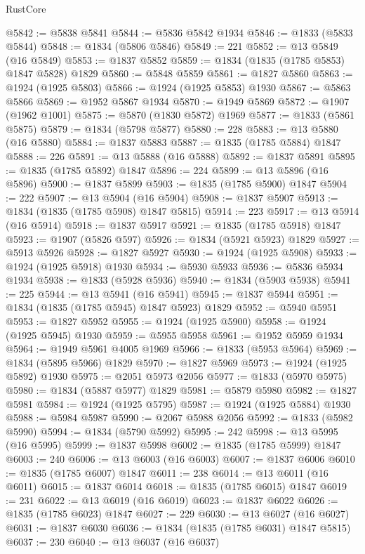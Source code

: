 \begin{lexlean}{RustCore}
\begin{coremodule}
@5842 := @5838 @5841
@5844 := @5836 @5842 @1934
@5846 := @1833 (@5833 @5844)
@5848 := @1834 (@5806 @5846)
@5849 := 221
@5852 := @13 @5849 (@16 @5849)
@5853 := @1837 @5852
@5859 := @1834 (@1835 (@1785 @5853) @1847 @5828) @1829
@5860 := @5848 @5859
@5861 := @1827 @5860
@5863 := @1924 (@1925 @5803)
@5866 := @1924 (@1925 @5853) @1930
@5867 := @5863 @5866
@5869 := @1952 @5867 @1934
@5870 := @1949 @5869
@5872 := @1907 (@1962 @1001)
@5875 := @5870 (@1830 @5872) @1969
@5877 := @1833 (@5861 @5875)
@5879 := @1834 (@5798 @5877)
@5880 := 228
@5883 := @13 @5880 (@16 @5880)
@5884 := @1837 @5883
@5887 := @1835 (@1785 @5884) @1847
@5888 := 226
@5891 := @13 @5888 (@16 @5888)
@5892 := @1837 @5891
@5895 := @1835 (@1785 @5892) @1847
@5896 := 224
@5899 := @13 @5896 (@16 @5896)
@5900 := @1837 @5899
@5903 := @1835 (@1785 @5900) @1847
@5904 := 222
@5907 := @13 @5904 (@16 @5904)
@5908 := @1837 @5907
@5913 := @1834 (@1835 (@1785 @5908) @1847 @5815)
@5914 := 223
@5917 := @13 @5914 (@16 @5914)
@5918 := @1837 @5917
@5921 := @1835 (@1785 @5918) @1847
@5923 := @1907 (@5826 @597)
@5926 := @1834 (@5921 @5923) @1829
@5927 := @5913 @5926
@5928 := @1827 @5927
@5930 := @1924 (@1925 @5908)
@5933 := @1924 (@1925 @5918) @1930
@5934 := @5930 @5933
@5936 := @5836 @5934 @1934
@5938 := @1833 (@5928 @5936)
@5940 := @1834 (@5903 @5938)
@5941 := 225
@5944 := @13 @5941 (@16 @5941)
@5945 := @1837 @5944
@5951 := @1834 (@1835 (@1785 @5945) @1847 @5923) @1829
@5952 := @5940 @5951
@5953 := @1827 @5952
@5955 := @1924 (@1925 @5900)
@5958 := @1924 (@1925 @5945) @1930
@5959 := @5955 @5958
@5961 := @1952 @5959 @1934
@5964 := @1949 @5961 @4005 @1969
@5966 := @1833 (@5953 @5964)
@5969 := @1834 (@5895 @5966) @1829
@5970 := @1827 @5969
@5973 := @1924 (@1925 @5892) @1930
@5975 := @2051 @5973 @2056
@5977 := @1833 (@5970 @5975)
@5980 := @1834 (@5887 @5977) @1829
@5981 := @5879 @5980
@5982 := @1827 @5981
@5984 := @1924 (@1925 @5795)
@5987 := @1924 (@1925 @5884) @1930
@5988 := @5984 @5987
@5990 := @2067 @5988 @2056
@5992 := @1833 (@5982 @5990)
@5994 := @1834 (@5790 @5992)
@5995 := 242
@5998 := @13 @5995 (@16 @5995)
@5999 := @1837 @5998
@6002 := @1835 (@1785 @5999) @1847
@6003 := 240
@6006 := @13 @6003 (@16 @6003)
@6007 := @1837 @6006
@6010 := @1835 (@1785 @6007) @1847
@6011 := 238
@6014 := @13 @6011 (@16 @6011)
@6015 := @1837 @6014
@6018 := @1835 (@1785 @6015) @1847
@6019 := 231
@6022 := @13 @6019 (@16 @6019)
@6023 := @1837 @6022
@6026 := @1835 (@1785 @6023) @1847
@6027 := 229
@6030 := @13 @6027 (@16 @6027)
@6031 := @1837 @6030
@6036 := @1834 (@1835 (@1785 @6031) @1847 @5815)
@6037 := 230
@6040 := @13 @6037 (@16 @6037)

\end{coremodule}
\end{lexlean}
